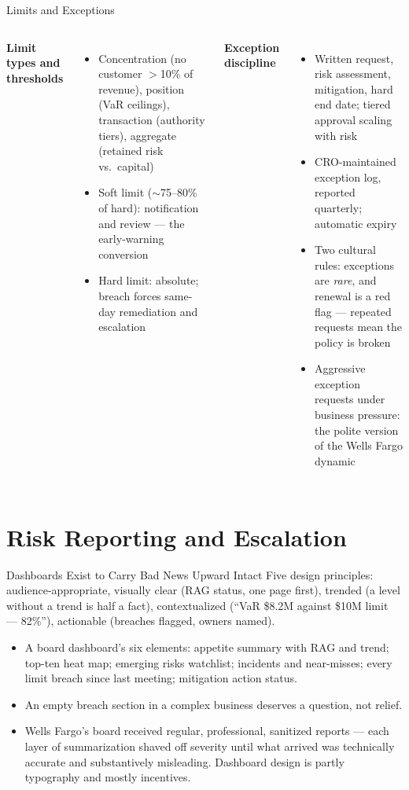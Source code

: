 \documentclass[11pt, aspectratio=169]{beamer}
\begin{document}
\begin{frame}{Limits and Exceptions}
\begin{columns}[T]
\textbf{Limit types and thresholds}
\begin{itemize}
  \item Concentration (no customer $>$10\% of revenue), position (VaR ceilings), transaction (authority tiers), aggregate (retained risk vs.\ capital)
  \item \alert{Soft limit} ($\sim$75--80\% of hard): notification and review --- the early-warning conversion
  \item \alert{Hard limit}: absolute; breach forces same-day remediation and escalation
\end{itemize}
\textbf{Exception discipline}
\begin{itemize}
  \item Written request, risk assessment, mitigation, \alert{hard end date}; tiered approval scaling with risk
  \item CRO-maintained exception log, reported quarterly; automatic expiry
  \item Two cultural rules: exceptions are \emph{rare}, and renewal is a red flag --- repeated requests mean the policy is broken
  \item Aggressive exception requests under business pressure: the polite version of the Wells Fargo dynamic
\end{itemize}
\end{columns}
\end{frame}

\section{Risk Reporting and Escalation}

\begin{frame}{Dashboards Exist to Carry Bad News Upward Intact}
Five design principles: \alert{audience-appropriate}, \alert{visually clear} (RAG status, one page first), \alert{trended} (a level without a trend is half a fact), \alert{contextualized} (``VaR \$8.2M against \$10M limit --- 82\%''), \alert{actionable} (breaches flagged, owners named).
\medskip
\begin{itemize}
  \item A board dashboard's six elements: appetite summary with RAG and trend; top-ten heat map; emerging risks watchlist; incidents and near-misses; \alert{every limit breach} since last meeting; mitigation action status.
  \item An empty breach section in a complex business deserves a question, not relief.
  \item Wells Fargo's board received regular, professional, sanitized reports --- each layer of summarization shaved off severity until what arrived was technically accurate and substantively misleading. Dashboard design is partly typography and mostly \alert{incentives}.
\end{itemize}
\end{frame}
\end{document}
